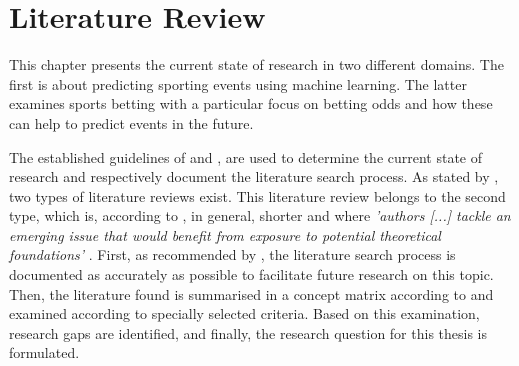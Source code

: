 \chapter{Literature Review}
\label{chap:literature_review}

This chapter presents the current state of research in two different domains. The first is about predicting sporting events using machine learning. The latter examines sports betting with a particular focus on betting odds and how these can help to predict events in the future.

\indent The established guidelines of \citet{vom_brocke_standing_2015} and \citet{webster_guest_2002}, are used to determine the current state of research and respectively document the literature search process. As stated by \citet{webster_guest_2002}, two types of literature reviews exist. This literature review belongs to the second type, which is, according to \citeauthor{webster_guest_2002}, in general, shorter and where \emph{'authors [...] tackle an emerging issue that would benefit from exposure to potential theoretical foundations'} \parencite[, p. 14]{webster_guest_2002}. First, as recommended by \citet{vom_brocke_standing_2015}, the literature search process is documented as accurately as possible to facilitate future research on this topic. Then, the literature found is summarised in a concept matrix according to \citet{webster_guest_2002} and examined according to specially selected criteria. Based on this examination, research gaps are identified, and finally, the research question for this thesis is formulated.

